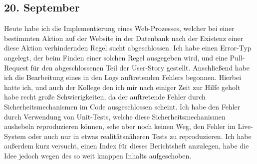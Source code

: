 \subsection{20. September}
Heute habe ich die Implementierung eines Web-Prozesses, welcher bei einer bestimmten Aktion auf der Website in der Datenbank nach der Existenz einer diese Aktion verhindernden Regel sucht abgeschlossen. Ich habe einen Error-Typ angelegt, der beim Finden einer solchen Regel ausgegeben wird, und eine Pull-Request für den abgeschlossenen Teil der User-Story gestellt. Anschließend habe ich die Bearbeitung eines in den Logs auftretenden Fehlers begonnen. Hierbei hatte ich, und auch der Kollege den ich mir nach einiger Zeit zur Hilfe geholt habe recht große Schwierigkeiten, da der auftretende Fehler durch Sicherheitsmechanismen im Code ausgeschlossen scheint. Ich habe den Fehler durch Verwendung von Unit-Tests, welche diese Sicherheitsmechanismen aushebeln reproduzieren können, sehe aber noch keinen Weg, den Fehler im Live-System oder auch nur in etwas realitätsnäheren Tests zu reproduzieren. Ich habe außerdem kurz versucht, einen Index für dieses Berichtsheft anzulegen, habe die Idee jedoch wegen des so weit knappen Inhalts aufgeschoben.